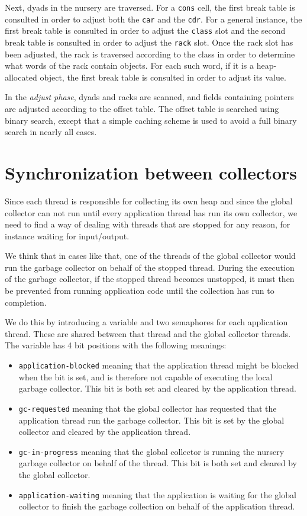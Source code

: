 Next, dyads in the nursery are traversed.  For a \texttt{cons} cell,
the first break table is consulted in order to adjust both the
\texttt{car} and the \texttt{cdr}.  For a general instance, the first
break table is consulted in order to adjust the \texttt{class} slot
and the second break table is consulted in order to adjust the
\texttt{rack} slot.  Once the rack slot has been adjusted, the rack is
traversed according to the class in order to determine what words of
the rack contain \commonlisp{} objects.  For each such word, if it is
a heap-allocated object, the first break table is consulted in order
to adjust its value.

In the \emph{adjust phase}, dyads and racks are scanned, and fields
containing pointers are adjusted according to the offset table.  The
offset table is searched using binary search, except that a simple
caching scheme is used to avoid a full binary search in nearly all
cases.

\section{Synchronization between collectors}
\label{sec-garbage-collection-synchronization-between-collectors}

Since each thread is responsible for collecting its own heap and since
the global collector can not run until every application thread has
run its own collector, we need to find a way of dealing with threads
that are stopped for any reason, for instance waiting for
input/output.

We think that in cases like that, one of the threads of the global
collector would run the garbage collector on behalf of the stopped
thread.  During the execution of the garbage collector, if the stopped
thread becomes unstopped, it must then be prevented from running
application code until the collection has run to completion.

We do this by introducing a variable and two semaphores for each
application thread. These are shared between that thread and the global
collector threads.  The variable has 4 bit positions with the
following meanings:

\begin{itemize}
\item \texttt{application-blocked} meaning that the application thread
  might be blocked when the bit is set, and is therefore not capable
  of executing the local garbage collector.  This bit is both set and
  cleared by the application thread.
\item \texttt{gc-requested} meaning that the global collector has
  requested that the application thread run the garbage collector.
  This bit is set by the global collector and cleared by the
  application thread.
\item \texttt{gc-in-progress} meaning that the global collector is
  running the nursery garbage collector on behalf of the thread.  This
  bit is both set and cleared by the global collector.
\item \texttt{application-waiting} meaning that the application is
  waiting for the global collector to finish the garbage collection on
  behalf of the application thread.
\end{itemize}

